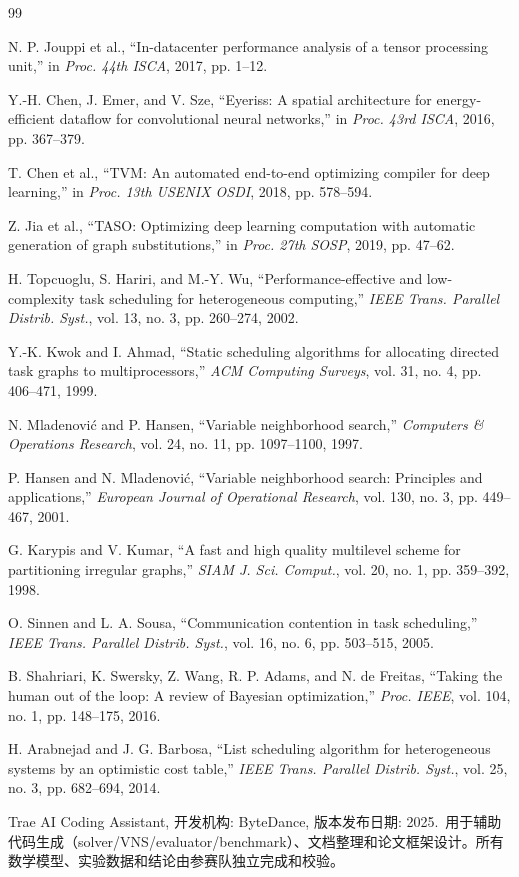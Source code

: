 \documentclass[bwprint]{gmcmthesis}
\begin{document}
\begin{thebibliography}{99}

 N. P. Jouppi et al., ``In-datacenter performance analysis of a tensor processing unit,'' in \textit{Proc. 44th ISCA}, 2017, pp. 1--12.

 Y.-H. Chen, J. Emer, and V. Sze, ``Eyeriss: A spatial architecture for energy-efficient dataflow for convolutional neural networks,'' in \textit{Proc. 43rd ISCA}, 2016, pp. 367--379.

 T. Chen et al., ``TVM: An automated end-to-end optimizing compiler for deep learning,'' in \textit{Proc. 13th USENIX OSDI}, 2018, pp. 578--594.

 Z. Jia et al., ``TASO: Optimizing deep learning computation with automatic generation of graph substitutions,'' in \textit{Proc. 27th SOSP}, 2019, pp. 47--62.

 H. Topcuoglu, S. Hariri, and M.-Y. Wu, ``Performance-effective and low-complexity task scheduling for heterogeneous computing,'' \textit{IEEE Trans. Parallel Distrib. Syst.}, vol. 13, no. 3, pp. 260--274, 2002.

 Y.-K. Kwok and I. Ahmad, ``Static scheduling algorithms for allocating directed task graphs to multiprocessors,'' \textit{ACM Computing Surveys}, vol. 31, no. 4, pp. 406--471, 1999.

 N. Mladenovi\'{c} and P. Hansen, ``Variable neighborhood search,'' \textit{Computers \& Operations Research}, vol. 24, no. 11, pp. 1097--1100, 1997.

 P. Hansen and N. Mladenovi\'{c}, ``Variable neighborhood search: Principles and applications,'' \textit{European Journal of Operational Research}, vol. 130, no. 3, pp. 449--467, 2001.

 G. Karypis and V. Kumar, ``A fast and high quality multilevel scheme for partitioning irregular graphs,'' \textit{SIAM J. Sci. Comput.}, vol. 20, no. 1, pp. 359--392, 1998.

 O. Sinnen and L. A. Sousa, ``Communication contention in task scheduling,'' \textit{IEEE Trans. Parallel Distrib. Syst.}, vol. 16, no. 6, pp. 503--515, 2005.

 B. Shahriari, K. Swersky, Z. Wang, R. P. Adams, and N. de Freitas, ``Taking the human out of the loop: A review of Bayesian optimization,'' \textit{Proc. IEEE}, vol. 104, no. 1, pp. 148--175, 2016.

 H. Arabnejad and J. G. Barbosa, ``List scheduling algorithm for heterogeneous systems by an optimistic cost table,'' \textit{IEEE Trans. Parallel Distrib. Syst.}, vol. 25, no. 3, pp. 682--694, 2014.

 Trae AI Coding Assistant, 开发机构: ByteDance, 版本发布日期: 2025.\ 用于辅助代码生成（solver/VNS/evaluator/benchmark）、文档整理和论文框架设计。所有数学模型、实验数据和结论由参赛队独立完成和校验。

\end{thebibliography}
\end{document}
